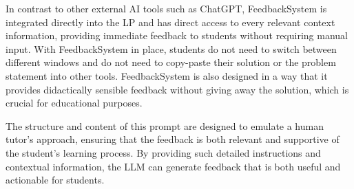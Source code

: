\documentclass[sigconf,screen,review,anonymous]{acmart}
\begin{document}
In contrast to other external AI tools such as ChatGPT, FeedbackSystem is integrated directly into the LP and has direct access to every relevant context information, providing immediate feedback to students without requiring manual input.
With FeedbackSystem in place, students do not need to switch between different windows and do not need to copy-paste their solution or the problem statement into other tools. 
FeedbackSystem is also designed in a way that it provides didactically sensible feedback without giving away the solution, which is crucial for educational purposes.

The structure and content of this prompt are designed to emulate a human tutor's approach, ensuring that the feedback is both relevant and supportive of the student's learning process.
By providing such detailed instructions and contextual information, the LLM can generate feedback that is both useful and actionable for students.
\end{document}

